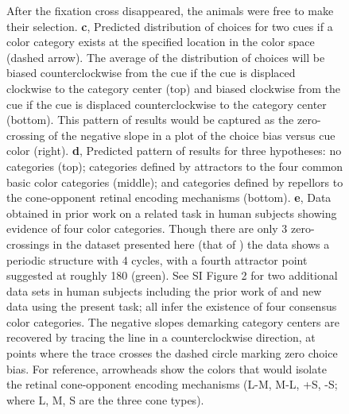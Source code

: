 \documentclass[9pt,biorxiv,lineno,onehalfspacing]{lapreprint}
\begin{document}
\begin{refsection}
\begin{figure}
\begin{fullwidth}
{    After the fixation cross disappeared, the animals were free to make their selection. 
	\textbf{c}, Predicted distribution of choices for two cues if a color category exists at the specified location in the color space (dashed arrow). 
	The average of the distribution of choices will be biased counterclockwise from the cue if the cue is displaced clockwise to the category center (top) and biased clockwise from the cue if the cue is displaced counterclockwise to the category center (bottom). 
    This pattern of results would be captured as the zero-crossing of the negative slope in a plot of the choice bias versus cue color (right). 
	\textbf{d}, Predicted pattern of results for three hypotheses: no categories (top); categories defined by attractors to the four common basic color categories (middle); and categories defined by repellors to the cone-opponent retinal encoding mechanisms (bottom). 
	\textbf{e}, Data obtained in prior work on a related task in human subjects showing evidence of four color categories. 
    Though there are only 3 zero-crossings in the dataset presented here (that of \citet{bae_why_2015}) the data shows a periodic structure with 4 cycles, with a fourth attractor point suggested at roughly 180\degree{} (green). 
    See SI Figure 2 for two additional data sets in human subjects including the prior work of \citet{panichello_error-correcting_2019} and new data using the present task; all infer the existence of four consensus color categories. 
    The negative slopes demarking category centers are recovered by tracing the line in a counterclockwise direction, at points where the trace crosses the dashed circle marking zero choice bias. 
    For reference, arrowheads show the colors that would isolate the retinal cone-opponent encoding mechanisms (L-M, M-L, +S, -S; where L, M, S are the three cone types).}
    \label{fig:ParadigmAnalysisPredictions}
    \end{fullwidth}
\end{figure}


\end{refsection}
\end{document}
